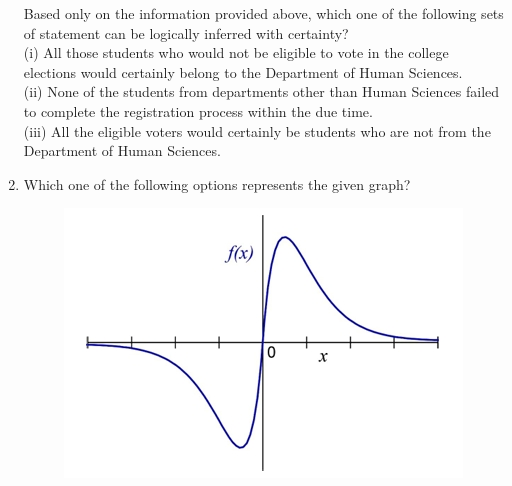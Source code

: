 \documentclass[journal,12pt,onecolumn]{IEEEtran}
\theoremstyle{remark}
\begin{document}
\begin{enumerate}
Based only on the information provided above, which one of the following sets of statement can be logically inferred with certainty? \\
(i) All those students who would not be eligible to vote in the college elections would certainly belong to the Department of Human Sciences. \\
(ii) None of the students from departments other than Human Sciences failed to complete the registration process within the due time. \\
(iii) All the eligible voters would certainly be students who are not from the Department of Human Sciences. \\

\begin{enumerate}
\end{enumerate}
\hfill{}

\newpage

\item Which one of the following options represents the given graph? \\[0.5em]
\begin{figure}[h]
    \centering
    \includegraphics[width=0.5\linewidth]{figs/img 2.jpeg}
    \caption{}
    \label{fig:placeholder}
\end{figure}



\end{enumerate}
\end{document}
